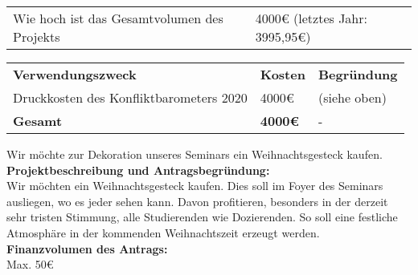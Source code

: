 {\begin{tabular}{l l}
        Wie hoch ist das Gesamtvolumen des Projekts                             &  4000€ (letztes Jahr: 3995,95€)\\
    \end{tabular}
    \newline
    \vspace*{2em}
    \newline
    \begin{tabular}{p{4cm} p{2cm} p{9cm}}
        \textbf{Verwendungszweck} & \textbf{Kosten} & \textbf{Begründung} \\
        Druckkosten des Konfliktbarometers 2020 & 4000€ & (siehe oben)\\
        \textbf{Gesamt} & \textbf{4000€} & - \\  
    \end{tabular}
}{}
{
    Wir möchte zur Dekoration unseres Seminars ein Weihnachtsgesteck kaufen.
}{
    \textbf{Projektbeschreibung und Antragsbegründung:}\\
    Wir möchten ein Weihnachtsgesteck kaufen. Dies soll im Foyer des Seminars ausliegen, wo es jeder sehen kann. Davon profitieren, besonders in der derzeit sehr tristen Stimmung, alle Studierenden wie Dozierenden. So soll eine festliche Atmosphäre in der kommenden Weihnachtszeit erzeugt werden.\\[1em]
    \textbf{Finanzvolumen des Antrags:}\\
    Max. 50€
}{}

